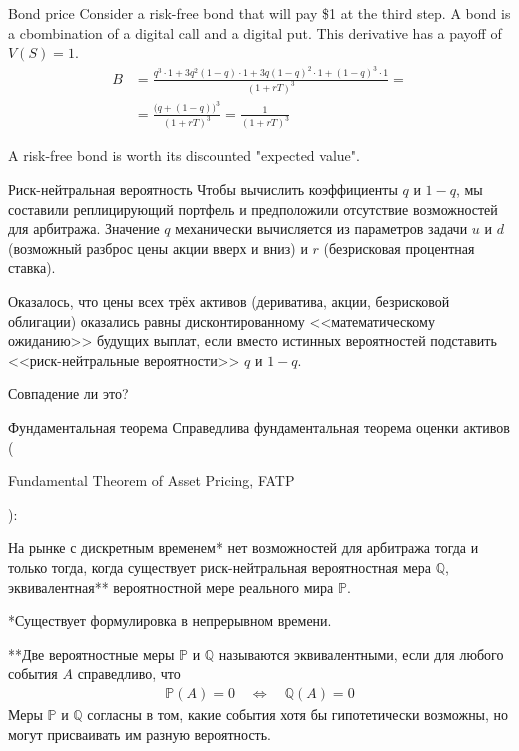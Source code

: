 \documentclass{beamer}
\newcommand{\en}[1]{\begin{otherlanguage}{english}#1\end{otherlanguage}}
\begin{document}
\begin{frame}{Bond price}
\justify
Consider a risk-free bond that will pay \$1 at the third step. A bond is a cbombination of a digital call and a digital put. This derivative has a payoff of $V(S) = 1$.
\begin{align*}
B &= \frac{q^3 \cdot 1 + 3q^2(1-q) \cdot 1 + 3q(1-q)^2 \cdot 1 + (1-q)^3 \cdot 1}{(1+rT)^3} = \\
&= \frac{\Big(q + (1-q) \Big)^3}{(1+rT)^3} = \frac{1}{(1+rT)^3}
\end{align*}

\justify
A risk-free bond is worth its discounted "expected value".
\end{frame}



\begin{frame}{Риск-нейтральная вероятность}
\justify
Чтобы вычислить коэффициенты $q$ и $1-q$, мы составили реплицирующий портфель и предположили отсутствие возможностей для арбитража. Значение $q$ механически вычисляется из параметров задачи $u$ и $d$ (возможный разброс цены акции вверх и вниз) и $r$ (безрисковая процентная ставка).

\justify
Оказалось, что цены всех трёх активов (дериватива, акции, безрисковой облигации) оказались равны дисконтированному <<математическому ожиданию>> будущих выплат, если вместо истинных вероятностей подставить <<риск-нейтральные вероятности>> $q$ и $1-q$.

\justify
Совпадение ли это?
\end{frame}



\begin{frame}{Фундаментальная теорема}
\justify
Справедлива фундаментальная теорема оценки активов (\en{Fundamental Theorem of Asset Pricing, FATP}):

\justify
На рынке с дискретным временем* нет возможностей для арбитража тогда и только тогда, когда существует риск-нейтральная вероятностная мера $\mathbb{Q}$, эквивалентная** вероятностной мере реального мира $\mathbb{P}$.

\justify
*Существует формулировка в непрерывном времени.

\justify
**Две вероятностные меры $\mathbb{P}$ и $\mathbb{Q}$ называются эквивалентными, если для любого события $A$ справедливо, что
\begin{align*}
\mathbb{P}(A)=0 \quad \Leftrightarrow \quad \mathbb{Q}(A)=0
\end{align*}
Меры $\mathbb{P}$ и $\mathbb{Q}$ согласны в том, какие события хотя бы гипотетически возможны, но могут присваивать им разную вероятность.
\end{frame}
\end{document}
